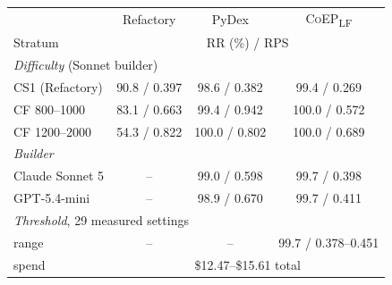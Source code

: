 \begin{tabular}{lccc}
\toprule
& Refactory & PyDex & \textsc{CoEP}\textsubscript{LF} \\
Stratum & \multicolumn{3}{c}{RR (\%) / RPS} \\
\midrule
\multicolumn{4}{l}{\emph{Difficulty} (Sonnet builder)}\\
\quad CS1 (Refactory) & 90.8 / 0.397 & 98.6 / 0.382 & 99.4 / 0.269 \\
\quad CF 800--1000 & 83.1 / 0.663 & 99.4 / 0.942 & 100.0 / 0.572 \\
\quad CF 1200--2000 & 54.3 / 0.822 & 100.0 / 0.802 & 100.0 / 0.689 \\
\midrule
\multicolumn{4}{l}{\emph{Builder}}\\
\quad Claude Sonnet 5 & -- & 99.0 / 0.598 & 99.7 / 0.398 \\
\quad GPT-5.4-mini & -- & 98.9 / 0.670 & 99.7 / 0.411 \\
\midrule
\multicolumn{4}{l}{\emph{Threshold}, 29 measured settings}\\
\quad range & -- & -- & 99.7 / 0.378--0.451 \\
\quad spend & \multicolumn{3}{c}{\$12.47--\$15.61 total} \\
\bottomrule
\end{tabular}
